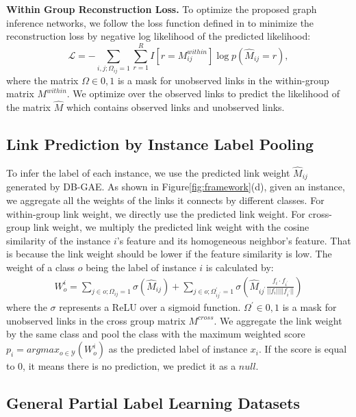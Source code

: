 \documentclass[letterpaper]{article} \usepackage{aaai20}  \usepackage{times}  \usepackage{helvet} \usepackage{courier}  \usepackage[hyphens]{url}  \usepackage{graphicx} \urlstyle{rm} \def\UrlFont{\rm}  \frenchspacing  \setlength{\pdfpagewidth}{8.5in}  \setlength{\pdfpageheight}{11in}  \frenchspacing
\begin{document}
\noindent \textbf{Within Group Reconstruction Loss.} To optimize the proposed graph inference networks, we follow the loss function defined in \cite{berg2017graph} to minimize the reconstruction loss by negative log likelihood of the predicted likelihood:
 \begin{equation}
 \mathcal{L} = - \sum_{i,j;\Omega_{ij}=1}\sum_{r=1}^{R} I[r = M^{within}_{ij}] \log p(\hat{M}_{ij} = r),
 \end{equation}
where the matrix $ \Omega \in {0, 1}$ is a mask for unobserved links in the within-group matrix $M^{within}$. We optimize over the observed links to predict the likelihood of the matrix $\hat{M}$ which contains observed links and unobserved links. 




\subsection{Link Prediction by Instance Label Pooling}
To infer the label of each instance, we use the predicted link weight $\hat{M}_{ij}$ generated by DB-GAE. 
As shown in Figure\ref{fig:framework}(d), given an instance, we aggregate all the weights of the links it connects by different classes. For within-group link weight, we directly use the predicted link weight. For cross-group link weight, we multiply the predicted link weight with the cosine similarity of the instance $i$'s feature and its homogeneous neighbor's feature. That is because the link weight should be lower if the feature similarity is low. The weight of a class $o$ being the label of instance $i$ is calculated by:
 \begin{align}
W_o^i =  \sum_{j \in o;\Omega_{ij}=1}\sigma(\hat{M}_{ij}) + \sum_{j \in o;\Omega^{\prime}_{ij^{\prime}}=1}\sigma(\hat{M}_{ij^{\prime}}\frac{f_i \cdot f_{i^\prime} }{||f_i||||f_{i^\prime}|| } )
 \end{align}
 where the $\sigma$ represents a ReLU over a sigmoid function. $ \Omega^\prime \in {0, 1}$ is a mask for unobserved links in the cross group matrix $M^{cross}$.
 We aggregate the link weight by the same class and pool the class with the maximum weighted score $p_i = argmax_{o \in \mathcal{Y}}(W^i_o)$ as the predicted label of instance $x_i$. 
 If the score is equal to 0, it means there is no prediction, we predict it as a $null$. 



\subsection{General Partial Label Learning Datasets} \label{sec:dataset}
\end{document}
